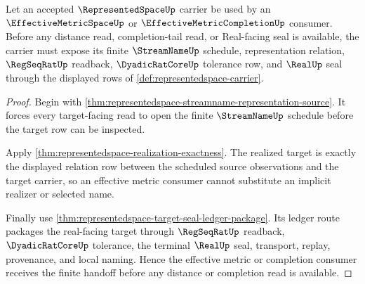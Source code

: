\begin{theorem}
\label{thm:representedspace-effective-metric-realizer-handoff}
Let an accepted $\RepresentedSpaceUp$ carrier be used by an $\EffectiveMetricSpaceUp$ or $\EffectiveMetricCompletionUp$ consumer. Before any distance read, completion-tail read, or Real-facing seal is available, the carrier must expose its finite $\StreamNameUp$ schedule, representation relation, $\RegSeqRatUp$ readback, $\DyadicRatCoreUp$ tolerance row, and $\RealUp$ seal through the displayed rows of \autoref{def:representedspace-carrier}.
\end{theorem}
\begin{proof}
Begin with \autoref{thm:representedspace-streamname-representation-source}. It forces every target-facing read to open the finite $\StreamNameUp$ schedule before the target row can be inspected.

Apply \autoref{thm:representedspace-realization-exactness}. The realized target is exactly the displayed relation row between the scheduled source observations and the target carrier, so an effective metric consumer cannot substitute an implicit realizer or selected name.

Finally use \autoref{thm:representedspace-target-seal-ledger-package}. Its ledger route packages the real-facing target through $\RegSeqRatUp$ readback, $\DyadicRatCoreUp$ tolerance, the terminal $\RealUp$ seal, transport, replay, provenance, and local naming. Hence the effective metric or completion consumer receives the finite handoff before any distance or completion read is available.
\end{proof}


